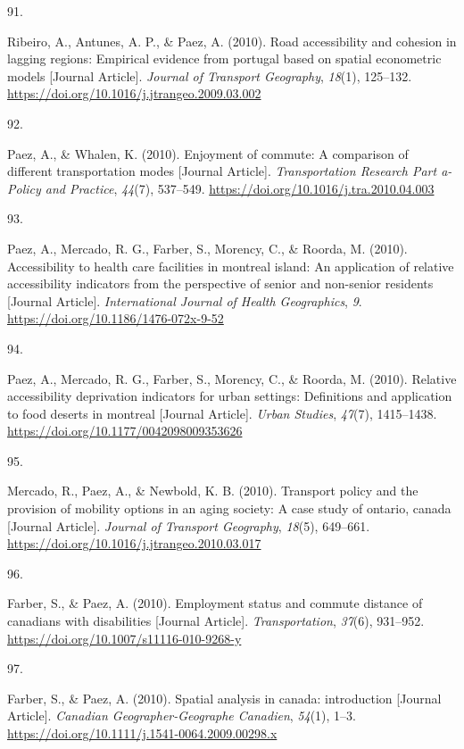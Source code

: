 \documentclass[11pt,a4paper,]{awesome-cv}
\newlength{\csllabelwidth}
\newcommand{\CSLLeftMargin}[1]{\parbox[t]{\csllabelwidth}{#1}}
\newcommand{\CSLRightInline}[1]{\parbox[t]{\linewidth - \csllabelwidth}{#1}}
\begin{document}
\leavevmode{}%
\CSLLeftMargin{91. }
\CSLRightInline{Ribeiro, A., Antunes, A. P., \& Paez, A. (2010). Road
accessibility and cohesion in lagging regions: Empirical evidence from
portugal based on spatial econometric models {[}Journal Article{]}.
\emph{Journal of Transport Geography}, \emph{18}(1), 125--132.
\url{https://doi.org/10.1016/j.jtrangeo.2009.03.002}}

\leavevmode{}%
\CSLLeftMargin{92. }
\CSLRightInline{Paez, A., \& Whalen, K. (2010). Enjoyment of commute: A
comparison of different transportation modes {[}Journal Article{]}.
\emph{Transportation Research Part a-Policy and Practice}, \emph{44}(7),
537--549. \url{https://doi.org/10.1016/j.tra.2010.04.003}}

\leavevmode{}%
\CSLLeftMargin{93. }
\CSLRightInline{Paez, A., Mercado, R. G., Farber, S., Morency, C., \&
Roorda, M. (2010). Accessibility to health care facilities in montreal
island: An application of relative accessibility indicators from the
perspective of senior and non-senior residents {[}Journal Article{]}.
\emph{International Journal of Health Geographics}, \emph{9}.
\url{https://doi.org/10.1186/1476-072x-9-52}}

\leavevmode{}%
\CSLLeftMargin{94. }
\CSLRightInline{Paez, A., Mercado, R. G., Farber, S., Morency, C., \&
Roorda, M. (2010). Relative accessibility deprivation indicators for
urban settings: Definitions and application to food deserts in montreal
{[}Journal Article{]}. \emph{Urban Studies}, \emph{47}(7), 1415--1438.
\url{https://doi.org/10.1177/0042098009353626}}

\leavevmode{}%
\CSLLeftMargin{95. }
\CSLRightInline{Mercado, R., Paez, A., \& Newbold, K. B. (2010).
Transport policy and the provision of mobility options in an aging
society: A case study of ontario, canada {[}Journal Article{]}.
\emph{Journal of Transport Geography}, \emph{18}(5), 649--661.
\url{https://doi.org/10.1016/j.jtrangeo.2010.03.017}}

\leavevmode{}%
\CSLLeftMargin{96. }
\CSLRightInline{Farber, S., \& Paez, A. (2010). Employment status and
commute distance of canadians with disabilities {[}Journal Article{]}.
\emph{Transportation}, \emph{37}(6), 931--952.
\url{https://doi.org/10.1007/s11116-010-9268-y}}

\leavevmode{}%
\CSLLeftMargin{97. }
\CSLRightInline{Farber, S., \& Paez, A. (2010). Spatial analysis in
canada: introduction {[}Journal Article{]}. \emph{Canadian
Geographer-Geographe Canadien}, \emph{54}(1), 1--3.
\url{https://doi.org/10.1111/j.1541-0064.2009.00298.x}}
\end{document}
